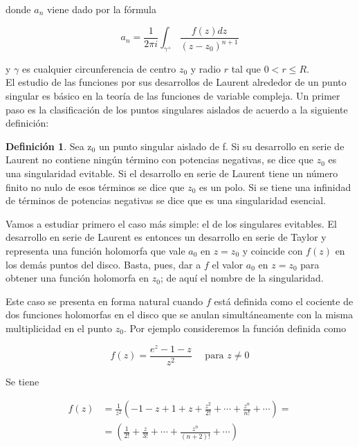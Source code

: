 \documentclass[10pt]{article}
\theoremstyle{plain}
\theoremstyle{definition}
\newtheorem{definition}[theorem]{Definición}
\theoremstyle{remark}
\begin{document}
donde $a_{n}$ viene dado por la fórmula


\begin{equation*}
a_{n}=\frac{1}{2 \pi i} \int_{\gamma^{+}} \frac{f(z) d z}{\left(z-z_{0}\right)^{n+1}} \tag{17-2}
\end{equation*}


y $\gamma$ es cualquier circunferencia de centro $z_{0}$ y radio $r$ tal que $0<r \leqslant R$.\\
El estudio de las funciones por sus desarrollos de Laurent alrededor de un punto singular es básico en la teoría de las funciones de variable compleja. Un primer paso es la clasificación de los puntos singulares aislados de acuerdo a la siguiente definición:

\begin{definition}
Sea $\mathrm{z}_{0}$ un punto singular aislado de f. Si su desarrollo en serie de Laurent no contiene ningún término con potencias negativas, se dice que $z_{0}$ es una singularidad evitable. Si el desarrollo en serie de Laurent tiene un número finito no nulo de esos términos se dice que $z_{0}$ es un polo. Si se tiene una infinidad de términos de potencias negativas se dice que es una singularidad esencial.  
\end{definition}

Vamos a estudiar primero el caso más simple: el de los singulares evitables. El desarrollo en serie de Laurent es entonces un desarrollo en serie de Taylor y representa una función holomorfa que vale $a_{0}$ en $z=z_{0}$ y coincide con $f(z)$ en los demás puntos del disco. Basta, pues, dar a $f$ el valor $a_{0}$ en $z=z_{0}$ para obtener una función holomorfa en $z_{0}$; de aquí el nombre de la singularidad.

Este caso se presenta en forma natural cuando $f$ está definida como el cociente de dos funciones holomorfas en el disco que se anulan simultáneamente con la misma multiplicidad en el punto $z_{0}$. Por ejemplo consideremos la función definida como

$$
f(z)=\frac{e^{z}-1-z}{z^{2}} \quad \text { para } z \neq 0
$$

Se tiene

$$
\begin{aligned}
f(z) & =\frac{1}{z^{2}}\left(-1-z+1+z+\frac{z^{2}}{2!}+\cdots+\frac{z^{n}}{n!}+\cdots\right)= \\
& =\left(\frac{1}{2!}+\frac{z}{3!}+\cdots+\frac{z^{n}}{(n+2)!}+\cdots\right)
\end{aligned}
$$
\end{document}
